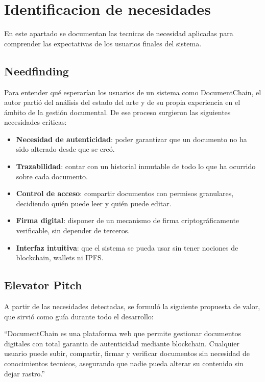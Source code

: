 \documentclass[11pt, a4paper]{article}
\begin{document}
\section{Identificacion de necesidades}

En este apartado se documentan las tecnicas de necesidad aplicadas para comprender las expectativas de los usuarios finales del sistema.

\subsection{Needfinding}

Para entender qu\'e esperar\'ian los usuarios de un sistema como DocumentChain, el autor parti\'o del an\'alisis del estado del arte y de su propia experiencia en el \'ambito de la gesti\'on documental. De ese proceso surgieron las siguientes necesidades cr\'iticas:

\begin{itemize}
    \item \textbf{Necesidad de autenticidad}: poder garantizar que un documento no ha sido alterado desde que se cre\'o.
    \item \textbf{Trazabilidad}: contar con un historial inmutable de todo lo que ha ocurrido sobre cada documento.
    \item \textbf{Control de acceso}: compartir documentos con permisos granulares, decidiendo qui\'en puede leer y qui\'en puede editar.
    \item \textbf{Firma digital}: disponer de un mecanismo de firma criptogr\'aficamente verificable, sin depender de terceros.
    \item \textbf{Interfaz intuitiva}: que el sistema se pueda usar sin tener nociones de blockchain, wallets ni IPFS.
\end{itemize}

\subsection{Elevator Pitch}

A partir de las necesidades detectadas, se formul\'o la siguiente propuesta de valor, que sirvi\'o como gu\'ia durante todo el desarrollo:

``DocumentChain es una plataforma web que permite gestionar documentos digitales con total garantia de autenticidad mediante blockchain. Cualquier usuario puede subir, compartir, firmar y verificar documentos sin necesidad de conocimientos tecnicos, asegurando que nadie pueda alterar su contenido sin dejar rastro.''
\end{document}
